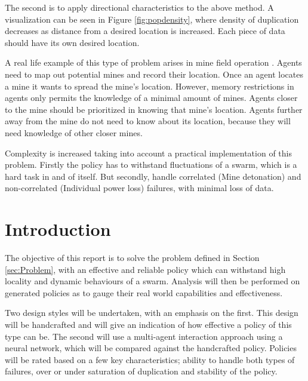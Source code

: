 \documentclass{UoYCSproject}
\begin{document}
The second is to apply directional characteristics to the above method.
A visualization can be seen in Figure \ref{fig:popdensity}, where density of duplication decreases as distance from a desired location is increased.
Each piece of data should have its own desired location.

A real life example of this type of problem arises in mine field operation \cite{Cognitive maps mine detection}.
Agents need to map out potential mines and record their location.
Once an agent locates a mine it wants to spread the mine’s location.
However, memory restrictions in agents only permits the knowledge of a minimal amount of mines.
Agents closer to the mine should be prioritized in knowing that mine’s location.
Agents further away from the mine do not need to know about its location, because they will need knowledge of other closer mines.

Complexity is increased taking into account a practical implementation of this problem.
Firstly the policy has to withstand fluctuations of a swarm, which is a hard task in and of itself.
But secondly, handle correlated (Mine detonation) and non-correlated (Individual power loss) failures, with minimal loss of data.




\section{Introduction}
\label{sec:Introduction}

The objective of this report is to solve the problem defined in Section \ref{sec:Problem}, with an effective and reliable policy which can withstand high locality and dynamic behaviours of a swarm.
Analysis will then be performed on generated policies as to gauge their real world capabilities and effectiveness.

Two design styles will be undertaken, with an emphasis on the first.
This design will be handcrafted and will give an indication of how effective a policy of this type can be.
The second will use a multi-agent interaction approach using a neural network, which will be compared against the handcrafted policy.
Policies will be rated based on a few key characteristics; ability to handle both types of failures, over or under saturation of duplication and stability of the policy.
\end{document}
